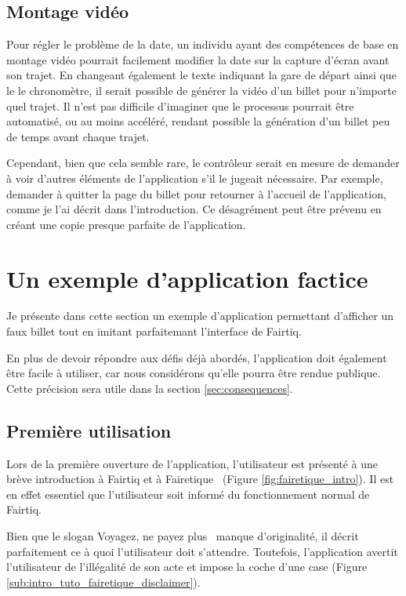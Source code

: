 \documentclass[a4paper]{article}
\begin{document}
\subsection{Montage vidéo}
Pour régler le problème de la date, un individu ayant des compétences de base en montage
vidéo pourrait facilement modifier la date sur la capture d'écran avant son trajet.
En changeant également le texte indiquant la gare de départ ainsi que le le chronomètre,
il serait possible de générer la vidéo d'un billet pour n'importe quel trajet.
Il n'est pas difficile d'imaginer que le processus pourrait être automatisé, ou au moins
accéléré, rendant possible la génération d'un billet peu de temps avant chaque trajet.

Cependant, bien que cela semble rare, le contrôleur serait en mesure de demander à
voir d'autres éléments de l'application s'il le jugeait nécessaire. Par exemple,
demander à quitter la page du billet pour retourner à l'accueil de l'application,
comme je l'ai décrit dans l'introduction. Ce désagrément peut être prévenu en
créant une copie presque parfaite de l'application.


\clearpage

\section{Un exemple d'application factice}

Je présente dans cette section un exemple d'application
permettant d'afficher un faux billet tout en imitant parfaitemant l'interface
de Fairtiq.

En plus de devoir répondre aux défis déjà abordés, l'application doit également être facile
à utiliser, car nous considérons qu'elle pourra être rendue publique. Cette précision sera utile
dans la section \ref*{sec:consequences}.

\subsection{Première utilisation}
Lors de la première ouverture de l'application, l'utilisateur est présenté à une brève introduction à
Fairtiq et à \og Fairetique \fg\ (Figure \ref*{fig:fairetique_intro}). Il est en effet essentiel
que l'utilisateur soit informé du fonctionnement normal de Fairtiq.

Bien que le slogan \og Voyagez, ne payez plus \fg\ manque d'originalité,
il décrit parfaitement ce à quoi l'utilisateur doit s'attendre.
Toutefois, l'application avertit l'utilisateur de l'illégalité de son acte et
impose la coche d'une case (Figure \ref*{sub:intro_tuto_fairetique_disclaimer}).
\end{document}
